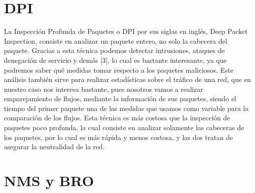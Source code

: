 \section{DPI}

La Inspección Profunda de Paquetes o DPI por sus siglas en inglés, Deep 
Packet Inspection, consiste en analizar un paquete entero, no solo la 
cabecera del paquete. Gracias a esta técnica podemos detectar intrusiones, 
ataques de denegación de servicio y demás [3], lo cual es bastante 
interesante, ya que podremos saber qué medidas tomar respecto a los 
paquetes maliciosos. Este análisis también sirve para realizar estadísticas 
sobre el tráfico de una red, que en nuestro caso nos interesa bastante, 
pues nosotros vamos a realizar emparejamiento de flujos, mediante la 
información de sus paquetes, siendo el tiempo del primer paquete una de las 
medidas que usamos como variable para la comparación de los flujos. Esta 
técnica es más costosa que la inspección de paquetes poco profunda, la 
cual consiste en analizar solamente las cabeceras de los paquetes, por 
lo cual es más rápida y menos costosa, y las dos tratan de asegurar 
la neutralidad de la red.

\section{NMS y BRO}

